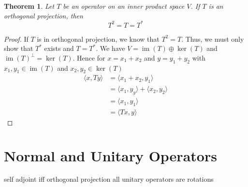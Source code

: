 \documentclass[oneside, 12pt]{book}
\DeclareMathOperator{\im}{im}
\newtheorem{thm}{Theorem}[section]
\theoremstyle{definition}
\begin{document}
\begin{thm}
  \label{thm_orthprojsubsp}
Let $T$ be an operator on an inner product space $V$. If $T$ is an orthogonal projection, then \[T^{2}=T=T^{*}\]
\end{thm}
\begin{proof}
  If $T$ is in orthogonal projection, we know that $T^{2}=T$. Thus, we must only show that $T^{*}$ exists and $T=T^{*}.$ We have $V= \im(T) \oplus \ker(T)$ and $\im(T)^{\perp}=\ker(T).$ Hence for $x=x_{1}+x_{2}$ and $y=y_{1}+y_{2}$ with $x_{1},y_{1} \in \im(T)$ and $x_{2},y_{2} \in \ker(T)$
  \begin{align}
    \langle x , Ty \rangle &= \langle x_{1}+x_{2}, y_{1} \rangle \\
               &=\langle x_{1}, y_{y} \rangle + \langle x_{2}, y_{2} \rangle \\
               &=\langle x_{1}, y_{1} \rangle \\
               &= \langle Tx, y \rangle
  \end{align}
\end{proof}
\section{Normal and Unitary Operators}
self adjoint iff orthogonal projection
all unitary operators are rotations
\end{document}
